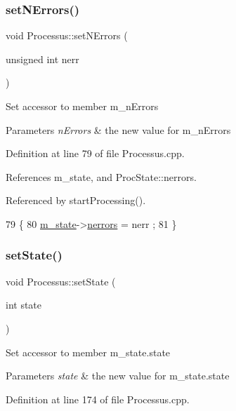 \subsubsection{\texorpdfstring{set\+N\+Errors()}{setNErrors()}}
{\footnotesize\ttfamily void Processus\+::set\+N\+Errors (\begin{DoxyParamCaption}\item[{unsigned int}]{nerr }\end{DoxyParamCaption})}

Set accessor to member m\+\_\+n\+Errors 
\begin{DoxyParams}{Parameters}
{\em n\+Errors} & the new value for m\+\_\+n\+Errors \\
\hline
\end{DoxyParams}


Definition at line 79 of file Processus.\+cpp.



References m\+\_\+state, and Proc\+State\+::nerrors.



Referenced by start\+Processing().


\begin{DoxyCode}
79                                              \{
80   \hyperlink{classProcessus_ab3539eee42891ceae0baf4395ae7fb61}{m\_state}->\hyperlink{structProcState_a51a0f54ba62b07e07ac8518c5f32828d}{nerrors} = nerr ;
81 \}
\end{DoxyCode}
\mbox{\label{classProcessus_ad38cde0f1bcefa00b068e7947b8af927}} 
\subsubsection{\texorpdfstring{set\+State()}{setState()}}
{\footnotesize\ttfamily void Processus\+::set\+State (\begin{DoxyParamCaption}\item[{int}]{state }\end{DoxyParamCaption})}

Set accessor to member m\+\_\+state.\+state 
\begin{DoxyParams}{Parameters}
{\em state} & the new value for m\+\_\+state.\+state \\
\hline
\end{DoxyParams}


Definition at line 174 of file Processus.\+cpp.




